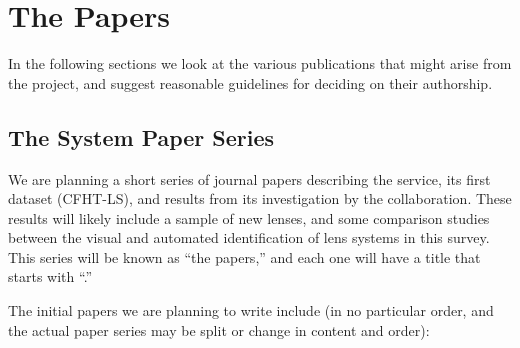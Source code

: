 \documentclass[a4paper]{article}
\begin{document}




\section{The \SW Papers}

In the following sections we look at the various publications that might
arise from the \sw project, and suggest reasonable guidelines for
deciding on their authorship. 

\subsection{The \sw System Paper Series}
\label{sec:series}

We are planning a short series of journal papers describing the \sw service,
its first dataset (CFHT-LS), and results from its investigation by the
collaboration. These results will likely include a sample of new lenses, and
some comparison studies between the visual and automated identification of
lens systems in this survey. This series will be known as ``the \sw papers,''
and each one will have a title that starts with ``\sw.''

The initial papers we are planning to write include (in no particular order,
and the actual paper series may be split or change in content and order):
\end{document}
